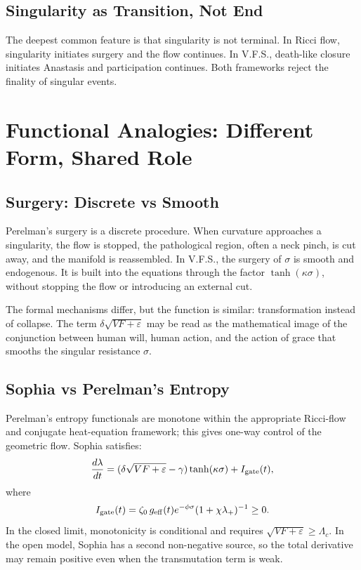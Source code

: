 \documentclass[11pt]{article}
\newcommand{\VFS}{V.F.S.}
\newcommand{\Gate}{I_{\rm gate}}
\newcommand{\Lc}{\Lambda_c}
\begin{document}
\subsection{Singularity as Transition, Not End}

The deepest common feature is that singularity is not terminal. In Ricci flow, singularity initiates surgery and the flow continues. In \VFS{}, death-like closure initiates Anastasis and participation continues. Both frameworks reject the finality of singular events.

\section{Functional Analogies: Different Form, Shared Role}

\subsection{Surgery: Discrete vs Smooth}

Perelman's surgery is a discrete procedure. When curvature approaches a singularity, the flow is stopped, the pathological region, often a neck pinch, is cut away, and the manifold is reassembled. In \VFS{}, the surgery of $\sigma$ is smooth and endogenous. It is built into the equations through the factor $\tanh(\kappa\sigma)$, without stopping the flow or introducing an external cut.

The formal mechanisms differ, but the function is similar: transformation instead of collapse. The term $\delta\sqrt{VF+\varepsilon}$ may be read as the mathematical image of the conjunction between human will, human action, and the action of grace that smooths the singular resistance $\sigma$.

\subsection{Sophia vs Perelman's Entropy}

Perelman's entropy functionals are monotone within the appropriate Ricci-flow and conjugate heat-equation framework; this gives one-way control of the geometric flow. Sophia satisfies:
\begin{equation}
\frac{d\lambda}{dt}
=(\delta\sqrt{VF+\varepsilon}-\gamma)\tanh(\kappa\sigma)+\Gate(t),
\end{equation}
where
\begin{equation}
\Gate(t)=\zeta_0\,g_{\rm eff}(t)e^{-\phi\sigma}(1+
\chi\lambda_+)^{-1}\ge0.
\end{equation}
In the closed limit, monotonicity is conditional and requires $\sqrt{VF+\varepsilon}\ge \Lc$. In the open model, Sophia has a second non-negative source, so the total derivative may remain positive even when the transmutation term is weak.
\end{document}
